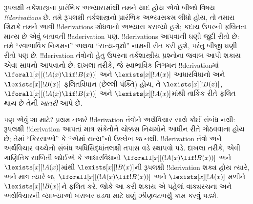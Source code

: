 \documentclass[../../../include/open-logic-section]{subfiles}
\begin{document}
રૂપલક્ષી તર્કશાસ્ત્રના પ્રારંભિક અભ્યાસમાંથી તમને યાદ હોય એવો બીજો
વિષય \emph{!!{derivation}s} છે. તમે રૂપલક્ષી તર્કશાસ્ત્રનો પ્રારંભિક
અભ્યાસક્રમ લીધો હોય, તો તમારા શિક્ષકે તમને આવી !!{derivation}s
શોધવાનો અભ્યાસ કરાવ્યો હશે; કદાચ ઉપરની ફલિતતા માન્ય છે એવું બતાવતી
!!a{derivation} પણ. !!{derivation}s આપવાની ઘણી જુદી રીતો છે: તમે
``સ્વાભાવિક નિગમન'' અથવા ``સત્ય-વૃક્ષો'' નામની રીત કરી હશે, પરંતુ
બીજી ઘણી રીતો પણ છે. !!{derivation} તંત્રોનો હેતુ ઉપરના
તર્કશાસ્ત્રીય પ્રશ્નોના જવાબ આપી શકાય એવા સાધનો આપવાનો છે: દાખલા
તરીકે, જે સ્વાભાવિક નિગમન !!{derivation}માં
$\lforall[x][(!A(x) \lif !B(x))]$ અને $\lexists[x][!A(x)]$ આધારવિધાનો
અને $\lexists[x][!B(x)]$ ફલિતવિધાન (છેલ્લી પંક્તિ) હોય, તે
$\lexists[x][!B(x)]$, $\lforall[x][(!A(x) \lif !B(x))]$ અને
$\lexists[x][!A(x)]$માંથી તાર્કિક રીતે ફલિત થાય છે તેની
\emph{ખાતરી} આપે છે.

પણ એવું શા માટે? પ્રથમ નજરે !!{derivation} તંત્રોને અર્થવિચાર સાથે
કોઈ સંબંધ નથી: રૂપલક્ષી !!{derivation} આપતાં માત્ર સંકેતોને ચોક્કસ
નિયમોને આધીન રીતે ગોઠવવાના હોય છે; તેમાં ``કિસ્સાઓ'' કે ``એમાં
સત્ય''નો ઉલ્લેખ જ નથી. !!{derivation} તંત્રો અને અર્થવિચાર વચ્ચેનો
સંબંધ અધિસિદ્ધાંતલક્ષી તપાસ વડે સ્થાપવો પડે. દાખલા તરીકે, એવી
ગાણિતિક સાબિતી જોઈએ કે આધારવિધાનો
$\lforall[x][(!A(x) \lif !B(x))]$ અને $\lexists[x][!A(x)]$માંથી
$\lexists[x][!B(x)]$ની રૂપલક્ષી !!{derivation} શક્ય હોય ત્યારે, અને
માત્ર ત્યારે જ, $\lforall[x][(!A(x) \lif !B(x))]$ અને
$\lexists[x][!A(x)]$ મળીને $\lexists[x][!B(x)]$ને ફલિત કરે. જોકે આ
કરી શકાય એ પહેલાં વાક્યરચના અને અર્થવિચારની વ્યાખ્યાઓ બરાબર ઘડવા માટે
ઘણું ઝીણવટભર્યું કામ કરવું પડશે.
\end{document}
